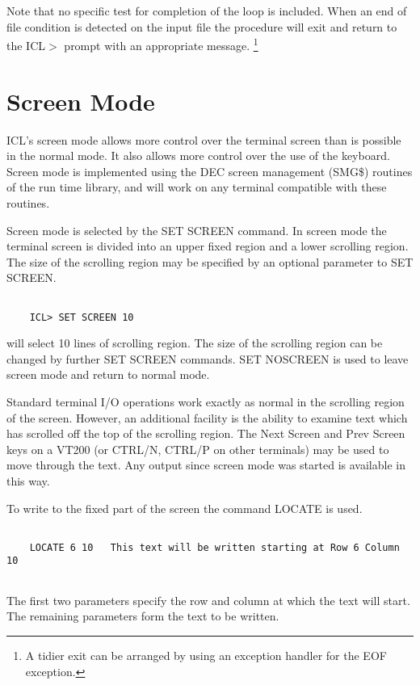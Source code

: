 \documentclass[twoside,11pt]{report}
\newcommand{\xlabel}[1]{}
\begin{document}
Note that no specific test for completion of the loop is included. When an end
of file condition is detected on the input file the procedure will exit and
return to the ICL$>$ prompt with an appropriate message. \footnote{A tidier
exit can be arranged by using an exception handler for the EOF exception.}

\section{\xlabel{screen_mode}Screen Mode}

ICL's screen mode allows more control over the terminal screen than is possible
in the normal mode. It also allows more control over the use of the keyboard.
Screen mode is implemented using the DEC screen management (SMG\$) routines
of the run time library, and will work on any terminal compatible with these
routines.

Screen mode is selected by the SET SCREEN command. In screen mode the terminal
screen is divided into an upper fixed region and a lower scrolling region.
The size of the scrolling region may be specified by an optional parameter
to SET SCREEN.
\begin{verbatim}

    ICL> SET SCREEN 10

\end{verbatim}
will select 10 lines of scrolling region. The size of the scrolling region
can be changed by further SET SCREEN commands. SET NOSCREEN is used to leave
screen mode and return to normal mode.

Standard terminal I/O operations work exactly as normal in the scrolling
region of the screen. However, an additional facility is the ability to
examine text which has scrolled off the top of the scrolling region. The
Next Screen and Prev Screen keys on a VT200 (or CTRL/N, CTRL/P on other
terminals) may be used to move through the text. Any output since screen
mode was started is available in this way.

To write to the fixed part of the screen the command LOCATE is used.
\begin{verbatim}

    LOCATE 6 10   This text will be written starting at Row 6 Column 10
            
\end{verbatim}
The first two parameters specify the row and column at which the text will
start. The remaining parameters form the text to be written.
\end{document}
